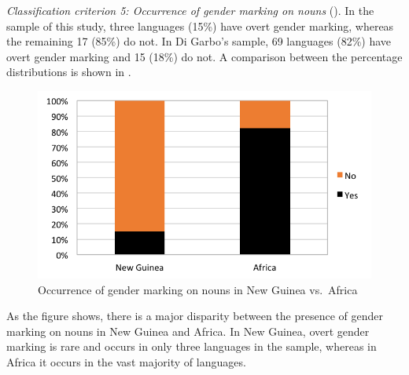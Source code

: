 \documentclass[output=collectionpaper]{langsci/langscibook}
\begin{document}
\textit{Classification criterion 5: Occurrence of gender marking on nouns} ().
In the sample of this study, three languages (15\%) have overt gender marking, whereas the remaining 17 (85\%) do not. In Di Garbo's sample, 69 languages (82\%) have overt gender marking and 15 (18\%) do not. A comparison between the percentage distributions is shown in .


\begin{figure}
\caption{Occurrence of gender marking on nouns in New Guinea vs.\ Africa}
\label{fig:Svard:11}
\includegraphics[width=.8\textwidth]{figures/09/fig11.png}
\end{figure}

As the figure shows, there is a major disparity between the presence of gender marking on nouns in New Guinea and Africa. In New Guinea, overt gender marking is rare and occurs in only three languages in the sample, whereas in Africa it occurs in the vast majority of languages.
\end{document}
